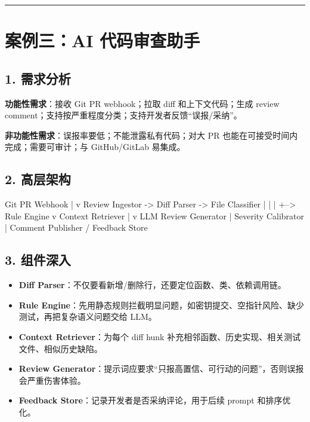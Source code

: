 \bigskip\hrule\bigskip

\section{案例三：AI 代码审查助手}

\subsection{1. 需求分析}
\textbf{功能性需求}：接收 Git PR webhook；拉取 diff 和上下文代码；生成 review comment；支持按严重程度分类；支持开发者反馈``误报/采纳''。


\textbf{非功能性需求}：误报率要低；不能泄露私有代码；对大 PR 也能在可接受时间内完成；需要可审计；与 GitHub/GitLab 易集成。


\subsection{2. 高层架构}
\begin{codeblock}
Git PR Webhook
      |
      v
  Review Ingestor -> Diff Parser -> File Classifier
                              |          |
                              |          +--> Rule Engine
                              v
                        Context Retriever
                              |
                              v
                      LLM Review Generator
                              |
                      Severity Calibrator
                              |
                  Comment Publisher / Feedback Store
\end{codeblock}

\subsection{3. 组件深入}
\begin{itemize}[leftmargin=2em]
\item \textbf{Diff Parser}：不仅要看新增/删除行，还要定位函数、类、依赖调用链。
\item \textbf{Rule Engine}：先用静态规则拦截明显问题，如密钥提交、空指针风险、缺少测试，再把复杂语义问题交给 LLM。
\item \textbf{Context Retriever}：为每个 diff hunk 补充相邻函数、历史实现、相关测试文件、相似历史缺陷。
\item \textbf{Review Generator}：提示词应要求``只报高置信、可行动的问题''，否则误报会严重伤害体验。
\item \textbf{Feedback Store}：记录开发者是否采纳评论，用于后续 prompt 和排序优化。
\end{itemize}

